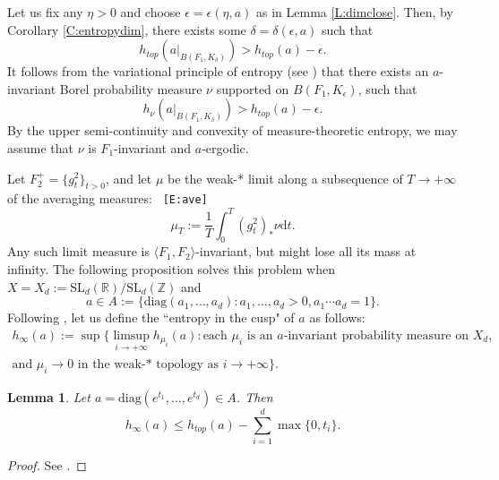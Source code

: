 \documentclass[reqno,12pt]{amsart}
\newtheorem{lemma}[theorem]{Lemma}
\theoremstyle{definition}
\numberwithin{equation}{section}
\newcommand{\RR}{\mathbb{R}}
\newcommand{\ZZ}{\mathbb{Z}}
\newcommand{\diag}{\mathrm{diag}}
\newcommand{\SL}{\mathrm{SL}}
\newcommand{\la}{\langle}
\newcommand{\ra}{\rangle}
\newcommand {\comm}[1]   {\textcolor{red}{#1}}
\newif\ifdraft\drafttrue
\newcommand\eq[2]{{\ifdraft{\ \tt [#1]}\else\ignorespaces\fi}\begin{equation}\label{eq:#1}{#2}\end{equation}}
\begin{document}
{Let us fix any $\eta>0$ and choose $\epsilon=\epsilon(\eta,a)$ as in Lemma \ref{L:dimclose}. Then, by Corollary \ref{C:entropydim}, there exists some $\delta=\delta(\epsilon, a)$ such that $$
h_{top}(a|_{B(F_1,K_{\delta})})>h_{top}(a)-\epsilon.
$$
It follows from the variational principle of entropy (see \cite[Theorem 8.6]{wal00}) %
that there exists an $a$-invariant Borel probability measure $\nu$ supported on $B(F_1,K_\epsilon)$, such that $$
h_{\nu}(a|_{B(F_1,K_\delta)})>
h_{top}(a)-\epsilon.
$$
By the upper semi-continuity and convexity of measure-theoretic entropy, we may assume that $\nu$ is $F_1$-invariant and $a$-ergodic.

Let $F_2^+=\{g^2_t\}_{t>0}$, and {let} $\mu$ be the weak-* limit along a subsequence of $T\to +\infty$ of the averaging measures:
\eq{E:ave}{\mu_T:=\frac{1}{T}\int_{0}^T(g^2_t)_*\nu\mathrm{d}t.}
Any such limit measure is $\la F_1,F_2\ra$-invariant, but might lose all its mass at infinity. The following proposition solves this problem when $X=X_d:=\SL_d(\RR)/\SL_d(\ZZ)$ and $${a\in A:=\{\diag(a_1,\dots,a_d):a_1,\dots,a_d>0,a_1\cdots a_d=1\}.}$$ Following \cite{ron23}, let us define the ``entropy in the cusp" of $a$ as follows: \begin{equation*}
        \begin{aligned}
h_{\infty}(a):=\sup\{\limsup_{i\to +\infty}h_{\mu_i}(a): \text{each }\mu_i\text{ is an } a\text{-invariant probability measure on }X_d,\\
    \text{and } \mu_i\to 0\text{ in the weak-* topology as } i\to +\infty\}.
        \end{aligned}
    \end{equation*}

{\begin{lemma}\label{L:Ron}
    Let $a=\diag(e^{t_1},\dots,e^{t_d})\in A$. %
    Then $$h_{\infty}(a)\leq h_{top}(a)-\sum_{i=1}^d\max\{0,t_i\}.$$
\end{lemma}
\begin{proof}
    See \cite[Theorem 1.3]{ron23}.
\end{proof}
}

}
\end{document}
